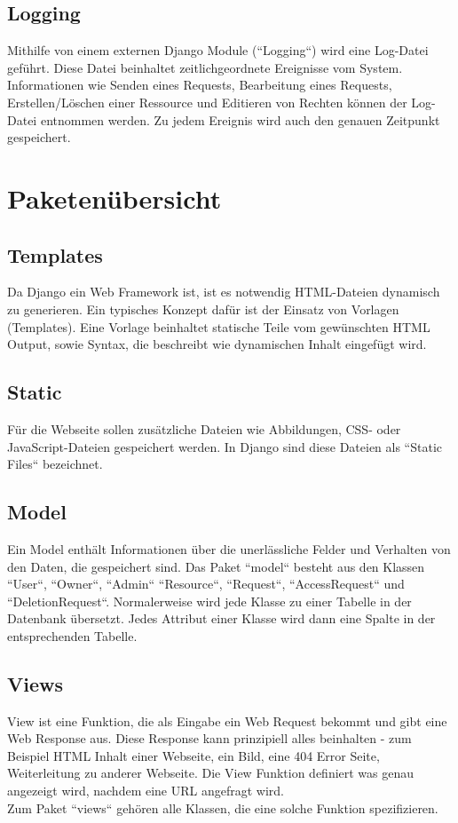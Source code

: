 \documentclass[parskip=full,11pt]{scrartcl}
\begin{document}
 \subsection{Logging}
Mithilfe von einem externen Django Module (``Logging``) wird eine Log-Datei geführt. Diese Datei beinhaltet zeitlichgeordnete Ereignisse vom System. Informationen wie Senden eines Requests, Bearbeitung eines Requests, Erstellen/Löschen einer Ressource und Editieren von Rechten können der Log-Datei entnommen werden. Zu jedem Ereignis wird auch den genauen Zeitpunkt gespeichert.
 
 
 \section{Paketenübersicht}
 \subsection{Templates}
Da Django ein Web Framework ist, ist es notwendig HTML-Dateien dynamisch zu generieren. Ein typisches Konzept dafür ist der Einsatz von Vorlagen (Templates). Eine Vorlage beinhaltet statische Teile vom gewünschten HTML Output, sowie Syntax, die beschreibt wie dynamischen Inhalt eingefügt wird.
 \subsection{Static}
 Für die Webseite sollen zusätzliche Dateien wie Abbildungen, CSS- oder JavaScript-Dateien gespeichert werden. In Django sind diese Dateien als ``Static Files`` bezeichnet.
 \subsection{Model}
Ein Model enthält Informationen über die unerlässliche Felder und Verhalten von den Daten, die gespeichert sind.
Das Paket ``model`` besteht aus den Klassen ``User``, ``Owner``, ``Admin`` ``Resource``, ``Request``, ``AccessRequest`` und ``DeletionRequest``. Normalerweise wird jede Klasse zu einer Tabelle in der Datenbank übersetzt. Jedes Attribut einer Klasse wird dann eine Spalte in der entsprechenden Tabelle.
 \subsection{Views}
View ist eine Funktion, die als Eingabe ein Web Request bekommt und gibt  eine Web Response aus. Diese Response kann prinzipiell alles beinhalten - zum Beispiel HTML Inhalt einer Webseite, ein Bild, eine 404 Error Seite, Weiterleitung zu anderer Webseite. Die View Funktion definiert was genau angezeigt wird, nachdem eine URL angefragt wird.\\
 Zum Paket ``views`` gehören alle Klassen, die eine solche Funktion spezifizieren.
\end{document}
